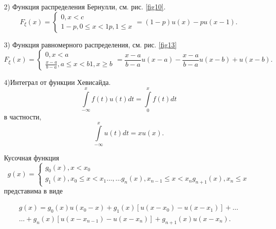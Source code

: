 \begin{example}
2) Функция распределения Бернулли, см. рис. \ref{fig10}.
\begin{equation*}
F_{\xi}(x) = 
 \begin{cases}
   0,x<c\\
   1-p,0\leqslant x<1
   p,1\leqslant x
 \end{cases}
 =(1-p)u(x)-pu(x-1).
\end{equation*}

3) Функция равномерного распределения, см. рис. \ref{fig13}
\begin{equation*}
F_{\xi}(x) = 
 \begin{cases}
   0,x<a\\
   \frac{x-a}{b-a},a\leqslant x<b
   1,x\geqslant b
 \end{cases}
 =
 \frac{x-a}{b-a}u(x-a)-\frac{x-a}{b-a}u(x-b)+u(x-b).
\end{equation*}

4)Интеграл от функции Хевисайда.
\begin{equation*}
	\int\limits_{-\infty}^x f(t)u(t)dt=\int\limits_0^xf(t)dt
\end{equation*}
в частности,
\begin{equation*}
	\int\limits_{-\infty}^x u(t)dt=xu(x).
\end{equation*}

\end{example}

\begin{lemma}
\label{lemma:13.3}
	Кусочная функция
\begin{equation*}
	g(x)=
	\begin{cases}
		g_0(x),x<x_0 \\
		g_1(x), x_0\leqslant x<x_1
		\ldots,\ldots
		g_n(x),x_{n-1}\leqslant x<x_n
		g_{n+1}(x), x_n\leqslant x
 	\end{cases}
\end{equation*}
	представима в виде

\begin{gather*}
g(x)=g_0(x)u(x_0-x)+g_1(x)[u(x-x_0)-u(x-x_1)]+\ldots \\
\ldots+g_n(x)[u(x-x_{n-1})-u(x-x_n)]+g_{n+1}(x)u(x-x_n).
\end{gather*}
\end{lemma}

